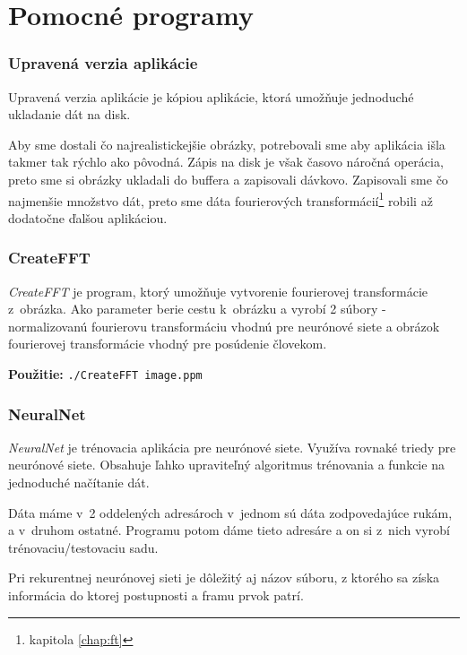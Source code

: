 \section{Pomocné programy}

\subsubsection{Upravená verzia aplikácie}
\label{chap:saveimageapp}
Upravená verzia aplikácie je kópiou aplikácie, ktorá umožňuje jednoduché ukladanie dát na disk.

Aby sme dostali čo najrealistickejšie obrázky, potrebovali sme aby aplikácia išla takmer tak rýchlo ako pôvodná. Zápis na disk je však časovo náročná operácia, preto sme si obrázky ukladali do buffera a zapisovali dávkovo. Zapisovali sme čo najmenšie množstvo dát, preto sme dáta fourierových transformácií\footnote{kapitola \ref{chap:ft} } robili až dodatočne ďalšou aplikáciou.

\subsubsection{CreateFFT}

\textit{CreateFFT} je program, ktorý umožňuje vytvorenie fourierovej transformácie z~obrázka. Ako parameter berie cestu k~obrázku a vyrobí 2 súbory - normalizovanú fourierovu transformáciu vhodnú pre neurónové siete a obrázok fourierovej transformácie vhodný pre posúdenie človekom.

\textbf{Použitie:} {\tt ./CreateFFT image.ppm}

\subsubsection{NeuralNet}
\textit{NeuralNet} je trénovacia aplikácia pre neurónové siete. Využíva rovnaké triedy pre neurónové siete. Obsahuje ľahko upraviteľný algoritmus trénovania a funkcie na jednoduché načítanie dát. 

Dáta máme v~2 oddelených adresároch v~jednom sú dáta zodpovedajúce rukám, a v~druhom ostatné. Programu potom dáme tieto adresáre a on si z~nich vyrobí trénovaciu/testovaciu sadu.

Pri rekurentnej neurónovej sieti je dôležitý aj názov súboru, z ktorého sa získa informácia do ktorej postupnosti a framu prvok patrí.

